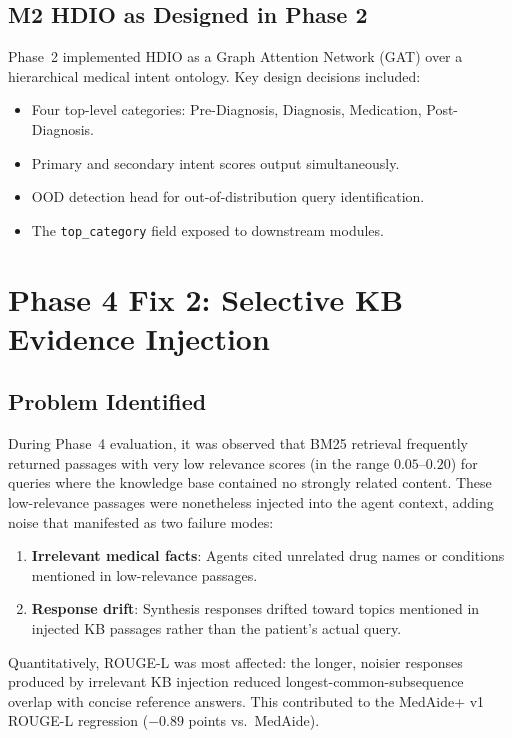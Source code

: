 \documentclass[a4paper,12pt]{article}
\begin{document}
\subsection{M2 HDIO as Designed in Phase 2}

Phase~2 implemented HDIO as a Graph Attention Network (GAT) over a
hierarchical medical intent ontology. Key design decisions included:
\begin{itemize}[noitemsep]
  \item Four top-level categories: Pre-Diagnosis, Diagnosis, Medication,
        Post-Diagnosis.
  \item Primary and secondary intent scores output simultaneously.
  \item OOD detection head for out-of-distribution query identification.
  \item The \texttt{top\_category} field exposed to downstream modules.
\end{itemize}

\section{Phase 4 Fix 2: Selective KB Evidence Injection}

\subsection{Problem Identified}

During Phase~4 evaluation, it was observed that BM25 retrieval frequently
returned passages with very low relevance scores (in the range $0.05$--$0.20$)
for queries where the knowledge base contained no strongly related content.
These low-relevance passages were nonetheless injected into the agent context,
adding noise that manifested as two failure modes:
\begin{enumerate}[noitemsep]
  \item \textbf{Irrelevant medical facts}: Agents cited unrelated drug names
        or conditions mentioned in low-relevance passages.
  \item \textbf{Response drift}: Synthesis responses drifted toward topics
        mentioned in injected KB passages rather than the patient's actual query.
\end{enumerate}

Quantitatively, ROUGE-L was most affected: the longer, noisier responses
produced by irrelevant KB injection reduced longest-common-subsequence
overlap with concise reference answers. This contributed to the MedAide+ v1
ROUGE-L regression ($-0.89$ points vs.\ MedAide).
\end{document}
